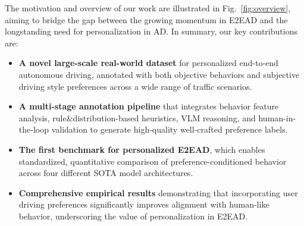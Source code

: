 \documentclass{article}
\begin{document}
The motivation and overview of our work are illustrated in Fig.~\ref{fig:overview}, aiming to bridge the gap between the growing momentum in E2EAD and the longstanding need for personalization in AD. In summary, our key contributions are:
\begin{itemize}[leftmargin=1em, topsep=0pt, itemsep=0.3em]
    \item \textbf{A novel large-scale real-world dataset} for personalized end-to-end autonomous driving, annotated with both objective behaviors and subjective driving style preferences across a wide range of traffic scenarios.
    \item \textbf{A multi-stage annotation pipeline} that integrates behavior feature analysis, rule\&distribution-based heuristics, VLM reasoning, and human-in-the-loop validation to generate high-quality well-crafted preference labels.
    \item \textbf{The first benchmark for personalized E2EAD}, which enables standardized, quantitative comparison of preference-conditioned behavior across four different SOTA model architectures.
    \item \textbf{Comprehensive empirical results} demonstrating that incorporating user driving preferences significantly improves alignment with human-like behavior, underscoring the value of personalization in E2EAD.
\end{itemize}
\end{document}
